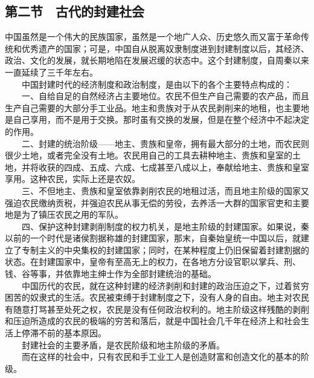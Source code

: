 \documentclass[cn,11pt,chinese]{elegantbook}
\def\myformat#1{\hfil\hfil #1}
\begin{document}
\subsection*{\myformat{第二节　古代的封建社会}}
中国虽然是一个伟大的民族国家，虽然是一个地广人众、历史悠久而又富于革命传统和优秀遗产的国家；可是，中国自从脱离奴隶制度进到封建制度以后，其经济、政治、文化的发展，就长期地陷在发展迟缓的状态中。这个封建制度，自周秦以来一直延续了三千年左右。\\
　　中国封建时代的经济制度和政治制度，是由以下的各个主要特点构成的：\\
　　一、自给自足的自然经济占主要地位。农民不但生产自己需要的农产品，而且生产自己需要的大部分手工业品。地主和贵族对于从农民剥削来的地租，也主要地是自己享用，而不是用于交换。那时虽有交换的发展，但是在整个经济中不起决定的作用。\\
　　二、封建的统治阶级——地主、贵族和皇帝，拥有最大部分的土地，而农民则很少土地，或者完全没有土地。农民用自己的工具去耕种地主、贵族和皇室的土地，并将收获的四成、五成、六成、七成甚至八成以上，奉献给地主、贵族和皇室享用。这种农民，实际上还是农奴。\\
　　三、不但地主、贵族和皇室依靠剥削农民的地租过活，而且地主阶级的国家又强迫农民缴纳贡税，并强迫农民从事无偿的劳役，去养活一大群的国家官吏和主要地是为了镇压农民之用的军队。\\
　　四、保护这种封建剥削制度的权力机关，是地主阶级的封建国家。如果说，秦以前的一个时代是诸侯割据称雄的封建国家，那末，自秦始皇统一中国以后，就建立了专制主义的中央集权的封建国家；同时，在某种程度上仍旧保留着封建割据的状态。在封建国家中，皇帝有至高无上的权力，在各地方分设官职以掌兵、刑、钱、谷等事，并依靠地主绅士作为全部封建统治的基础。\\
　　中国历代的农民，就在这种封建的经济剥削和封建的政治压迫之下，过着贫穷困苦的奴隶式的生活。农民被束缚于封建制度之下，没有人身的自由。地主对农民有随意打骂甚至处死之权，农民是没有任何政治权利的。地主阶级这样残酷的剥削和压迫所造成的农民的极端的穷苦和落后，就是中国社会几千年在经济上和社会生活上停滞不前的基本原因。\\
　　封建社会的主要矛盾，是农民阶级和地主阶级的矛盾。\\
　　而在这样的社会中，只有农民和手工业工人是创造财富和创造文化的基本的阶级。\\
\end{document}
